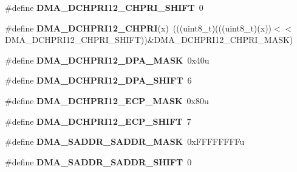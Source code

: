 \begin{DoxyCompactItemize}
\item 
\#define {\bfseries D\+M\+A\+\_\+\+D\+C\+H\+P\+R\+I12\+\_\+\+C\+H\+P\+R\+I\+\_\+\+S\+H\+I\+FT}~0\hypertarget{group__DMA__Register__Masks_ga463e67297f7a0d3b1c7c6799ac90fb15}{}\label{group__DMA__Register__Masks_ga463e67297f7a0d3b1c7c6799ac90fb15}

\item 
\#define {\bfseries D\+M\+A\+\_\+\+D\+C\+H\+P\+R\+I12\+\_\+\+C\+H\+P\+RI}(x)~(((uint8\+\_\+t)(((uint8\+\_\+t)(x))$<$$<$D\+M\+A\+\_\+\+D\+C\+H\+P\+R\+I12\+\_\+\+C\+H\+P\+R\+I\+\_\+\+S\+H\+I\+FT))\&D\+M\+A\+\_\+\+D\+C\+H\+P\+R\+I12\+\_\+\+C\+H\+P\+R\+I\+\_\+\+M\+A\+SK)\hypertarget{group__DMA__Register__Masks_ga6ecccb191b6a4cd797b6353bba497f4e}{}\label{group__DMA__Register__Masks_ga6ecccb191b6a4cd797b6353bba497f4e}

\item 
\#define {\bfseries D\+M\+A\+\_\+\+D\+C\+H\+P\+R\+I12\+\_\+\+D\+P\+A\+\_\+\+M\+A\+SK}~0x40u\hypertarget{group__DMA__Register__Masks_ga73ff6289479b47b9e3fd209fb447ef3a}{}\label{group__DMA__Register__Masks_ga73ff6289479b47b9e3fd209fb447ef3a}

\item 
\#define {\bfseries D\+M\+A\+\_\+\+D\+C\+H\+P\+R\+I12\+\_\+\+D\+P\+A\+\_\+\+S\+H\+I\+FT}~6\hypertarget{group__DMA__Register__Masks_ga2542343fffad88b0445eaa1d2db1e56f}{}\label{group__DMA__Register__Masks_ga2542343fffad88b0445eaa1d2db1e56f}

\item 
\#define {\bfseries D\+M\+A\+\_\+\+D\+C\+H\+P\+R\+I12\+\_\+\+E\+C\+P\+\_\+\+M\+A\+SK}~0x80u\hypertarget{group__DMA__Register__Masks_ga6670cd9c6c3dba8c53f330f44c6ca328}{}\label{group__DMA__Register__Masks_ga6670cd9c6c3dba8c53f330f44c6ca328}

\item 
\#define {\bfseries D\+M\+A\+\_\+\+D\+C\+H\+P\+R\+I12\+\_\+\+E\+C\+P\+\_\+\+S\+H\+I\+FT}~7\hypertarget{group__DMA__Register__Masks_ga5331565714ddd597bad4518d1c5317e4}{}\label{group__DMA__Register__Masks_ga5331565714ddd597bad4518d1c5317e4}

\item 
\#define {\bfseries D\+M\+A\+\_\+\+S\+A\+D\+D\+R\+\_\+\+S\+A\+D\+D\+R\+\_\+\+M\+A\+SK}~0x\+F\+F\+F\+F\+F\+F\+F\+Fu\hypertarget{group__DMA__Register__Masks_ga3dbf7c2ee61861c859e0cb3a420a77f8}{}\label{group__DMA__Register__Masks_ga3dbf7c2ee61861c859e0cb3a420a77f8}

\item 
\#define {\bfseries D\+M\+A\+\_\+\+S\+A\+D\+D\+R\+\_\+\+S\+A\+D\+D\+R\+\_\+\+S\+H\+I\+FT}~0\hypertarget{group__DMA__Register__Masks_ga02af13fd09f7b39e0fbbbb8e28ddcf4d}{}\label{group__DMA__Register__Masks_ga02af13fd09f7b39e0fbbbb8e28ddcf4d}


\end{DoxyCompactItemize}
